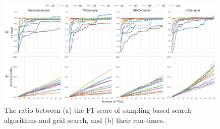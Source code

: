 


\begin{figure}[t]
    \centering
    \includegraphics[width=0.99\textwidth]{Nikoletos-paper/figures/predictions/combined_f1_runtime_ratios_vs_trials.png}
    \caption{The ratio between (a) the F1-score of sampling-based search algorithms and grid search, and (b) their run-times.
    }
    \label{fig:p1-samplers-performance-f1}
\end{figure}

